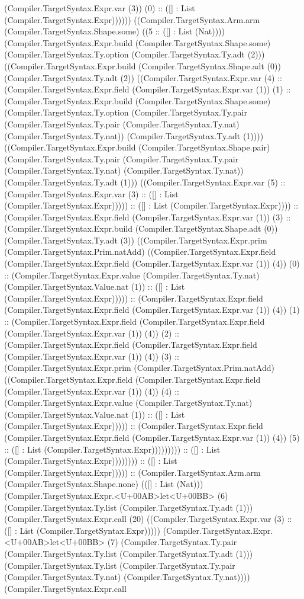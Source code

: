 \documentclass[11pt]{article}
\begin{document}
(Compiler.TargetSyntax.Expr.var (3)) (0) :: ([] : List (Compiler.TargetSyntax.Expr)))))) ((Compiler.TargetSyntax.Arm.arm (Compiler.TargetSyntax.Shape.some) ((5 :: ([] : List (Nat)))) (Compiler.TargetSyntax.Expr.build (Compiler.TargetSyntax.Shape.some) (Compiler.TargetSyntax.Ty.option (Compiler.TargetSyntax.Ty.adt (2))) ((Compiler.TargetSyntax.Expr.build (Compiler.TargetSyntax.Shape.adt (0)) (Compiler.TargetSyntax.Ty.adt (2)) ((Compiler.TargetSyntax.Expr.var (4) :: (Compiler.TargetSyntax.Expr.field (Compiler.TargetSyntax.Expr.var (1)) (1) :: (Compiler.TargetSyntax.Expr.build (Compiler.TargetSyntax.Shape.some) (Compiler.TargetSyntax.Ty.option (Compiler.TargetSyntax.Ty.pair (Compiler.TargetSyntax.Ty.pair (Compiler.TargetSyntax.Ty.nat) (Compiler.TargetSyntax.Ty.nat)) (Compiler.TargetSyntax.Ty.adt (1)))) ((Compiler.TargetSyntax.Expr.build (Compiler.TargetSyntax.Shape.pair) (Compiler.TargetSyntax.Ty.pair (Compiler.TargetSyntax.Ty.pair (Compiler.TargetSyntax.Ty.nat) (Compiler.TargetSyntax.Ty.nat)) (Compiler.TargetSyntax.Ty.adt (1))) ((Compiler.TargetSyntax.Expr.var (5) :: (Compiler.TargetSyntax.Expr.var (3) :: ([] : List (Compiler.TargetSyntax.Expr))))) :: ([] : List (Compiler.TargetSyntax.Expr)))) :: (Compiler.TargetSyntax.Expr.field (Compiler.TargetSyntax.Expr.var (1)) (3) :: (Compiler.TargetSyntax.Expr.build (Compiler.TargetSyntax.Shape.adt (0)) (Compiler.TargetSyntax.Ty.adt (3)) ((Compiler.TargetSyntax.Expr.prim (Compiler.TargetSyntax.Prim.natAdd) ((Compiler.TargetSyntax.Expr.field (Compiler.TargetSyntax.Expr.field (Compiler.TargetSyntax.Expr.var (1)) (4)) (0) :: (Compiler.TargetSyntax.Expr.value (Compiler.TargetSyntax.Ty.nat) (Compiler.TargetSyntax.Value.nat (1)) :: ([] : List (Compiler.TargetSyntax.Expr))))) :: (Compiler.TargetSyntax.Expr.field (Compiler.TargetSyntax.Expr.field (Compiler.TargetSyntax.Expr.var (1)) (4)) (1) :: (Compiler.TargetSyntax.Expr.field (Compiler.TargetSyntax.Expr.field (Compiler.TargetSyntax.Expr.var (1)) (4)) (2) :: (Compiler.TargetSyntax.Expr.field (Compiler.TargetSyntax.Expr.field (Compiler.TargetSyntax.Expr.var (1)) (4)) (3) :: (Compiler.TargetSyntax.Expr.prim (Compiler.TargetSyntax.Prim.natAdd) ((Compiler.TargetSyntax.Expr.field (Compiler.TargetSyntax.Expr.field (Compiler.TargetSyntax.Expr.var (1)) (4)) (4) :: (Compiler.TargetSyntax.Expr.value (Compiler.TargetSyntax.Ty.nat) (Compiler.TargetSyntax.Value.nat (1)) :: ([] : List (Compiler.TargetSyntax.Expr))))) :: (Compiler.TargetSyntax.Expr.field (Compiler.TargetSyntax.Expr.field (Compiler.TargetSyntax.Expr.var (1)) (4)) (5) :: ([] : List (Compiler.TargetSyntax.Expr))))))))) :: ([] : List (Compiler.TargetSyntax.Expr)))))))) :: ([] : List (Compiler.TargetSyntax.Expr))))) :: (Compiler.TargetSyntax.Arm.arm (Compiler.TargetSyntax.Shape.none) (([] : List (Nat))) (Compiler.TargetSyntax.Expr.<U+00AB>let<U+00BB> (6) (Compiler.TargetSyntax.Ty.list (Compiler.TargetSyntax.Ty.adt (1))) (Compiler.TargetSyntax.Expr.call (20) ((Compiler.TargetSyntax.Expr.var (3) :: ([] : List (Compiler.TargetSyntax.Expr))))) (Compiler.TargetSyntax.Expr.<U+00AB>let<U+00BB> (7) (Compiler.TargetSyntax.Ty.pair (Compiler.TargetSyntax.Ty.list (Compiler.TargetSyntax.Ty.adt (1))) (Compiler.TargetSyntax.Ty.list (Compiler.TargetSyntax.Ty.pair (Compiler.TargetSyntax.Ty.nat) (Compiler.TargetSyntax.Ty.nat)))) (Compiler.TargetSyntax.Expr.call 
\end{document}
